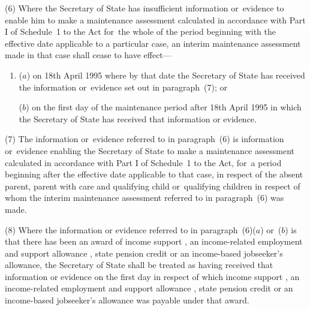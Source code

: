 \documentclass[a4paper,12pt]{article}
\begin{document}
(6) 
Where 
the Secretary of State  %
has insufficient information or~evidence to enable him to make a maintenance assessment calculated in accordance with Part I of Schedule~1 to the Act for~the whole of the period beginning with the effective date applicable to a particular case, an interim maintenance assessment made in that case shall cease to have effect—
\begin{enumerate}\item[]
($a$) on 18th April 1995 where by that date the Secretary of State has received the information or~evidence set out in paragraph~(7); or

($b$) on the first day of the maintenance period after 18th April 1995 in which the Secretary of State has received that information or evidence.
\end{enumerate}

(7) The information or~evidence referred to in paragraph~(6) is information or~evidence enabling 
the Secretary of State  %
to make a maintenance assessment calculated in accordance with Part I of Schedule~1 to the Act, for~a period beginning after the effective date applicable to that case, in respect of the absent parent, parent with care and qualifying child or~qualifying children in respect of whom the interim maintenance assessment referred to in paragraph~(6) was made.


(8) Where the information or evidence referred to in paragraph~(6)($a$) or~($b$) is that there has been an award of income support%
, an income-related employment and support allowance%
, state pension credit  %
or an income-based jobseeker’s allowance, the Secretary of State shall be treated as having received that information or evidence on the first day in respect of which income support%
, an income-related employment and support allowance%
, state pension credit  %
or an income-based jobseeker’s allowance was payable under that award.
\end{document}
